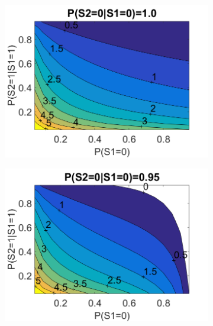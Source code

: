 \documentclass{edm_template}
\begin{document}
	
		\begin{figure}[!ht]\small
			\centering
			\begin{subfigure}[t]{0.32\linewidth}
				\centering
				\includegraphics[width=1.05\linewidth]{figures/contour1.png}
				\caption{\label{fig:contour1}}
			\end{subfigure}
			\begin{subfigure}[t]{0.32\linewidth}
				\centering
				\includegraphics[width=1.05\linewidth]{figures/contour2.png}
				\caption{\label{fig:contour2}}
			\end{subfigure}
			\begin{subfigure}[t]{0.32\linewidth}
				\centering

\end{subfigure}
\end{figure}
\end{document}
